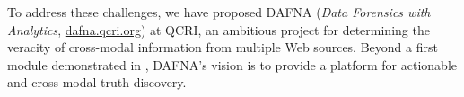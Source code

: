 \documentclass[prodmode,acmtecs]{acmsmall} %
\begin{document}
To address these challenges, we have proposed DAFNA (\emph{Data Forensics with Analytics}, {\small\url{dafna.qcri.org}}) at QCRI, an ambitious project for determining the veracity of  cross-modal information from multiple Web sources. Beyond a first module demonstrated in \cite{Wagui15}, DAFNA's vision is to provide a platform for actionable and cross-modal truth discovery.
 
 
 




\end{document}
